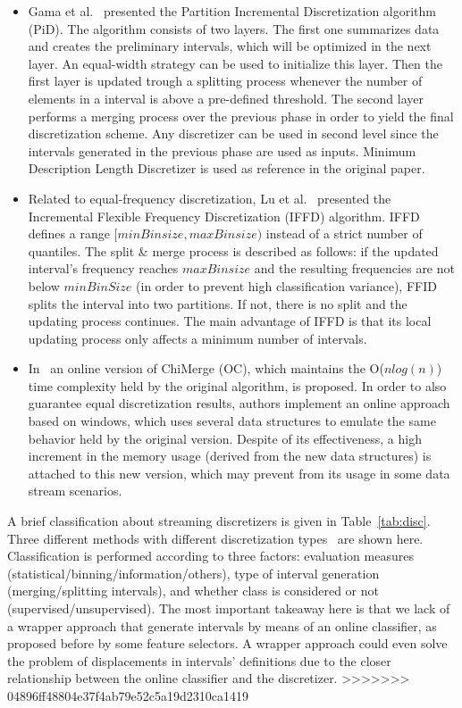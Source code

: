 \documentclass[preprint,12pt]{elsarticle}
\begin{document}
\begin{itemize}
\begin{itemize}
	\item Gama et al.~\cite{gama06} presented the Partition Incremental Discretization algorithm (PiD). The algorithm consists of two layers. The first one summarizes data and creates the preliminary intervals, which will be optimized in the next layer. An equal-width strategy can be used to initialize this layer. Then the first layer is updated trough a splitting process whenever the number of elements in a interval is above a pre-defined threshold. The second layer performs a merging process over the previous phase in order to yield the final discretization scheme. Any discretizer can be used in second level since the intervals generated in the previous phase are used as inputs. Minimum Description Length Discretizer is used as reference in the original paper.
	\item Related to equal-frequency discretization, Lu et al.~\cite{lu06} presented the Incremental Flexible Frequency Discretization (IFFD) algorithm. IFFD defines a range $[minBinsize, maxBinsize)$ instead of a strict number of quantiles. The split \& merge process is described as follows: if the updated interval's frequency reaches $maxBinsize$ and the resulting frequencies are not below $minBinSize$ (in order to prevent high classification variance), FFID splits the interval into two partitions. If not, there is no split and the updating process continues. The main advantage of IFFD is that its local updating process only affects a minimum number of intervals.
	\item In~\cite{lehti12} an online version of ChiMerge (OC), which maintains the O($nlog(n)$) time complexity held by the original algorithm, is proposed. In order to also guarantee equal discretization results, authors implement an online approach based on windows, which uses several data structures to emulate the same behavior held by the original version. Despite of its effectiveness, a high increment in the memory usage (derived from the new data structures) is attached to this new version, which may prevent from its usage in some data stream scenarios.
\end{itemize}

A brief classification about streaming discretizers is given in Table~\ref{tab:disc}. Three different methods with different discretization types~\cite{garcia14} are shown here. Classification is performed according to three factors: evaluation measures (statistical/binning/information/others), type of interval generation (merging/splitting intervals), and whether class is considered or not (supervised/unsupervised). The most important takeaway here is that we lack of a wrapper approach that generate intervals by means of an online classifier, as proposed before by some feature selectors. A wrapper approach could even solve the problem of displacements in intervals' definitions due to the closer relationship between the online classifier and the discretizer.
>>>>>>> 04896ff48804e37f4ab79e52c5a19d2310ca1419


\end{itemize}
\end{document}
